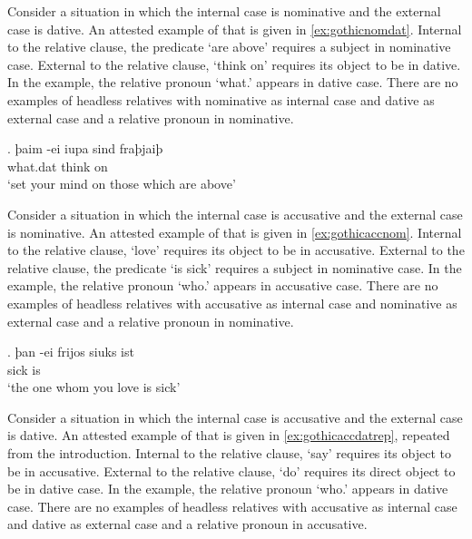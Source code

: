 Consider a situation in which the internal case is nominative and the external case is dative. An attested example of that is given in  \ref{ex:gothicnomdat}. Internal to the relative clause, the predicate  `are above' requires a subject in nominative case. External to the relative clause,  `think on' requires its object to be in dative. In the example, the relative pronoun  `what.' appears in dative case. There are no examples of headless relatives with nominative as internal case and dative as external case and a relative pronoun in nominative.

\exg. þaim -ei iupa sind fraþjaiþ \\
 what.\ac{dat}    {think on}\scsub{[dat]}\\
 `set your mind on those which are above' \label{ex:gothicnomdat}

Consider a situation in which the internal case is accusative and the external case is nominative. An attested example of that is given in  \ref{ex:gothicaccnom}. Internal to the relative clause,  `love' requires its object to be in accusative. External to the relative clause, the predicate  `is sick' requires a subject in nominative case. In the example, the relative pronoun  `who.' appears in accusative case. There are no examples of headless relatives with accusative as internal case and nominative as external case and a relative pronoun in nominative.

\exg. þan -ei frijos siuks ist\\
    sick is\scsub{[nom]}\\
 `the one whom you love is sick' \label{ex:gothicaccnom}

Consider a situation in which the internal case is accusative and the external case is dative. An attested example of that is given in  \ref{ex:gothicaccdatrep}, repeated from the introduction. Internal to the relative clause,  `say' requires its object to be in accusative. External to the relative clause,  `do' requires its direct object to be in dative case. In the example, the relative pronoun  `who.' appears in dative case. There are no examples of headless relatives with accusative as internal case and dative as external case and a relative pronoun in accusative.

